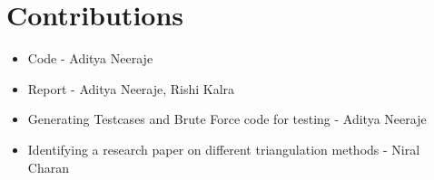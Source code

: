 \documentclass{article}
\begin{document}
\section{Contributions}
\begin{itemize}
  \item Code - Aditya Neeraje
  \item Report - Aditya Neeraje, Rishi Kalra
  \item Generating Testcases and Brute Force code for testing - Aditya Neeraje
  \item Identifying a research paper on different triangulation methods - Niral Charan
\end{itemize}
\end{document}
